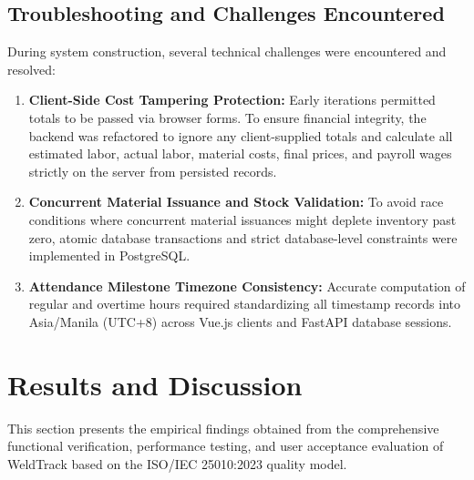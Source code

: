 \documentclass[12pt, letterpaper]{article}
\begin{document}
\subsection{Troubleshooting and Challenges Encountered}
\hspace*{2em} During system construction, several technical challenges were encountered and resolved:
\begin{enumerate}[label=\alph*.]
    \item \textbf{Client-Side Cost Tampering Protection:} Early iterations permitted totals to be passed via browser forms. To ensure financial integrity, the backend was refactored to ignore any client-supplied totals and calculate all estimated labor, actual labor, material costs, final prices, and payroll wages strictly on the server from persisted records.
    \item \textbf{Concurrent Material Issuance and Stock Validation:} To avoid race conditions where concurrent material issuances might deplete inventory past zero, atomic database transactions and strict database-level constraints were implemented in PostgreSQL.
    \item \textbf{Attendance Milestone Timezone Consistency:} Accurate computation of regular and overtime hours required standardizing all timestamp records into Asia/Manila (UTC+8) across Vue.js clients and FastAPI database sessions.
\end{enumerate}


\section{Results and Discussion}
\hspace*{2em} This section presents the empirical findings obtained from the comprehensive functional verification, performance testing, and user acceptance evaluation of WeldTrack based on the ISO/IEC 25010:2023 quality model.
\end{document}
